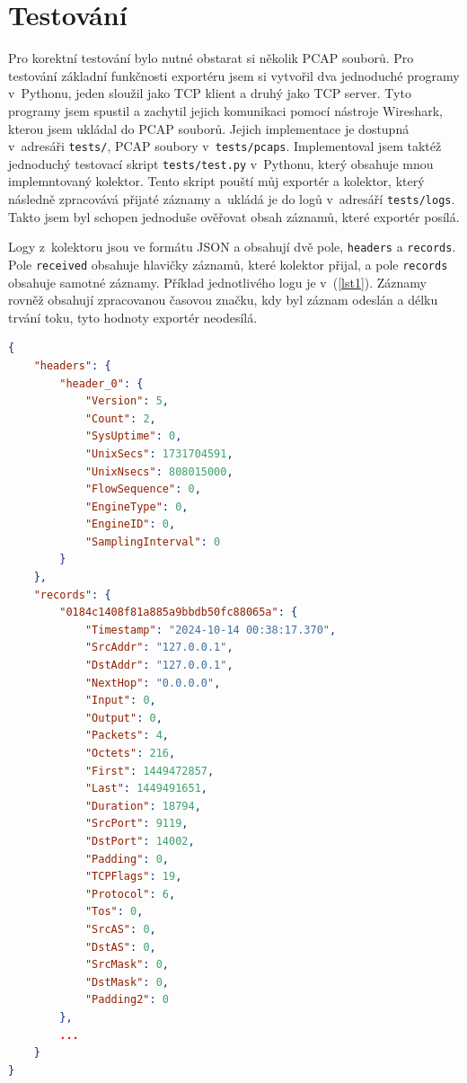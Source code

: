\documentclass[a4paper, 11pt]{article}
\begin{document}
\begin{sloppypar}
\section{Testování}
Pro korektní testování bylo nutné obstarat si několik PCAP souborů. Pro testování základní funkčnosti exportéru jsem si vytvořil dva jednoduché programy v~Pythonu, jeden sloužil jako TCP klient a druhý jako TCP server. Tyto programy jsem spustil a zachytil jejich komunikaci pomocí nástroje Wireshark, kterou jsem ukládal do PCAP souborů. Jejich implementace je dostupná v~adresáři \texttt{tests/}, PCAP soubory v~\texttt{tests/pcaps}. Implementoval jsem taktéž jednoduchý testovací skript \texttt{tests/test.py} v~Pythonu, který obsahuje mnou implemntovaný kolektor. Tento skript pouští můj exportér a kolektor, který následně zpracovává přijaté záznamy a~ukládá je do logů v~adresáří \texttt{tests/logs}. Takto jsem byl schopen jednoduše ověřovat obsah záznamů, které exportér posílá.

Logy z~kolektoru jsou ve formátu JSON a obsahují dvě pole, \texttt{headers} a \texttt{records}. Pole \texttt{received} obsahuje hlavičky záznamů, které kolektor přijal, a pole \texttt{records} obsahuje samotné záznamy. Příklad jednotlivého logu je v~(\ref{lst1}). Záznamy rovněž obsahují zpracovanou časovou značku, kdy byl záznam odeslán a délku trvání toku, tyto hodnoty exportér neodesílá.

\begin{lstlisting}[language=json, caption={Ukázka logu z~kolektoru}, label={lst1}]
{
    "headers": {
        "header_0": {
            "Version": 5,
            "Count": 2,
            "SysUptime": 0,
            "UnixSecs": 1731704591,
            "UnixNsecs": 808015000,
            "FlowSequence": 0,
            "EngineType": 0,
            "EngineID": 0,
            "SamplingInterval": 0
        }
    },
    "records": {
        "0184c1408f81a885a9bbdb50fc88065a": {
            "Timestamp": "2024-10-14 00:38:17.370",
            "SrcAddr": "127.0.0.1",
            "DstAddr": "127.0.0.1",
            "NextHop": "0.0.0.0",
            "Input": 0,
            "Output": 0,
            "Packets": 4,
            "Octets": 216,
            "First": 1449472857,
            "Last": 1449491651,
            "Duration": 18794,
            "SrcPort": 9119,
            "DstPort": 14002,
            "Padding": 0,
            "TCPFlags": 19,
            "Protocol": 6,
            "Tos": 0,
            "SrcAS": 0,
            "DstAS": 0,
            "SrcMask": 0,
            "DstMask": 0,
            "Padding2": 0
        },
        ...
    }
}


\end{lstlisting}
\end{sloppypar}
\end{document}

